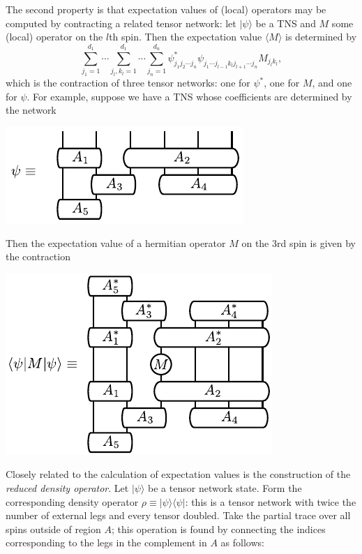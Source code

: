 \documentclass[prl,twocolumn,lengthcheck,superscriptaddress]{revtex4-1}
\theoremstyle{definition}
\theoremstyle{remark}
\begin{document}
The second property is that expectation values of (local) operators may be computed by contracting a related tensor network: let $|\psi\rangle$ be a TNS and $M$ some (local) operator on the $l$th spin. Then the expectation value $\langle M \rangle$ is determined by
\begin{equation}
	 \sum_{j_1 = 1}^{d_1}\cdots\sum_{j_l,k_l = 1}^{d_1} \cdots \sum_{j_{n} = 1}^{d_{n} } \psi^*_{j_1j_2 \cdots j_{n}}\psi_{j_1 \cdots j_{l-1}k_l j_{l+1} \cdots j_{n}} M_{j_lk_l},
\end{equation}
which is the contraction of three tensor networks: one for $\psi^*$, one for $M$, and one for $\psi$.
For example, suppose we have a TNS whose coefficients are determined by the network
\begin{center}
\includegraphics{psinw.pdf}
\end{center}
Then the expectation value of a hermitian operator $M$ on the 3rd spin is given by the contraction
\begin{center}
\includegraphics{expvals.pdf}
\end{center}
Closely related to the calculation of expectation values is the construction of the \emph{reduced density operator}. Let $|\psi\rangle$ be a tensor network state. Form the corresponding density operator $\rho \equiv |\psi\rangle\langle \psi|$: this is a tensor network with twice the number of external legs and every tensor doubled. Take the partial trace over all spins outside of region $A$; this operation is found by connecting the indices corresponding to the legs in the complement in $A$ as follows:
\end{document}
